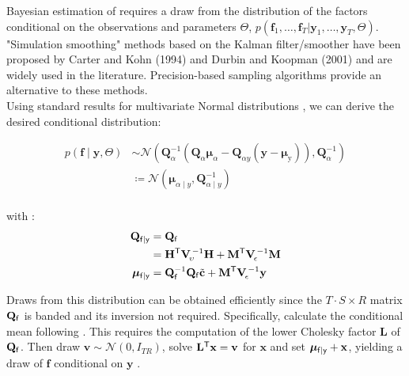 \documentclass[notitlepage,a4paper,12pt]{article}
\newcommand{\transpose}[1]{{#1}^{\sf{T}}}
\begin{document}
Bayesian estimation of  requires a draw from the distribution of the factors conditional on the observations and parameters $\Theta$, $p(\mathbf{f}_1, \dots, \mathbf{f}_T | \mathbf{y}_1, \dots, \mathbf{y}_T, \Theta)$. "Simulation smoothing" methods based on the Kalman filter/smoother have been proposed by Carter and Kohn (1994) and Durbin and Koopman (2001) and are widely used in the literature. Precision-based sampling algorithms \citep{chanjeliazkov_2009} provide an alternative to these methods.\\

Using standard results for multivariate Normal distributions \citep[e.g.][pp. 86-87]{bishop_prml_2006}, we can derive the desired conditional distribution:

\begin{align*}
    p
    \left(
    \mathbf{f} \mid \mathbf{y}, \Theta
     \right) 
    &\sim
    \mathcal{N}
    \left(
    \mathbf{Q}^{-1}_{\alpha} \left( \mathbf{Q}_{\alpha}\boldsymbol{\mu}_{\alpha} - \mathbf{Q}_{\alpha y} \left(\mathbf{y} - \boldsymbol{\mu}_{\text{y}}\right)\right), \mathbf{Q}_{\alpha}^{-1}
    \right) \\
    &\coloneqq \mathcal{N}
        \left(
            \boldsymbol{\mu}_{\alpha\mid y}, \mathbf{Q}_{\alpha\mid y}^{-1}
        \right) \\
\end{align*}

with \citep[see also][eqn. 6-8]{chanjeliazkov_2009}:
\begin{align*}
    \mathbf{Q}_{\sf{f}\mid y} &= \mathbf{Q}_{\sf{f}} \\
    &= 
    \transpose{\mathbf{H}} \mathbf{V}^{\,-1}_{\!\upsilon} \mathbf{H} + {\transpose{\mathbf{M}} \mathbf{V}^{\,-1}_{\!\epsilon}\mathbf{M}}\\
    \boldsymbol\mu_{\sf{f}\mid y} &= \mathbf{Q}_{\sf{f}}^{-1} \mathbf{Q}_{\sf{f}} \tilde{\mathbf{c}}+ \transpose{\mathbf{M}} \mathbf{V}_{\!\epsilon}^{\,-1} \mathbf{y}
\end{align*}

Draws from this distribution can be obtained efficiently since the $T\cdot S \times R$ matrix $\mathbf{Q}_{\sf{f}}$ is banded and its inversion not required. Specifically, calculate the conditional mean following \citet[][Algorithm 2.1]{rueheld_2005}. This requires the computation of the lower Cholesky factor $\mathbf{L}$ of $\mathbf{Q}_{\sf{f}}$. Then draw $\mathbf{v} \sim \mathcal{N}(0,I_{TR})$, solve $\transpose{\mathbf{L}} \mathbf{x} = \mathbf{v}$ for $\mathbf{x}$ and set $\boldsymbol{\mu}_{\sf{f}\mid y} +\mathbf{x}$, yielding a draw of $\mathbf{f}$ conditional on $\mathbf{y}$ \citep[][Algorithm 2.4]{rueheld_2005}. \\
\end{document}
